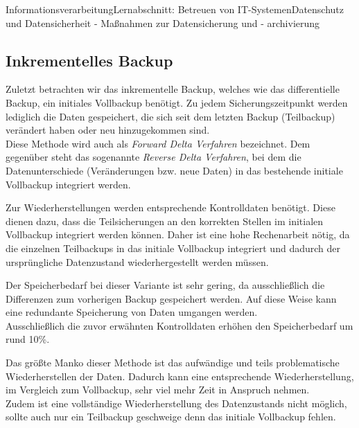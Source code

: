 \documentclass[11pt,oneside,openany,headings=optiontotoc,11pt,numbers=noenddot]{article}
\begin{document}
\begin{worksheet}{Informationsverarbeitung}{Lernabschnitt: Betreuen von IT-Systemen}{Datenschutz und Datensicherheit - Maßnahmen zur Datensicherung und - archivierung}
		\subsection{Inkrementelles Backup}
		Zuletzt betrachten wir das inkrementelle Backup, welches wie das differentielle Backup, ein initiales Vollbackup benötigt. Zu jedem Sicherungszeitpunkt werden lediglich die Daten gespeichert, die sich seit dem letzten Backup (Teilbackup) verändert haben oder neu hinzugekommen sind.\\
		Diese Methode wird auch als \textit{Forward Delta Verfahren} bezeichnet. Dem gegenüber steht das sogenannte \textit{Reverse Delta Verfahren}, bei dem die Datenunterschiede (Veränderungen bzw. neue Daten) in das bestehende initiale Vollbackup integriert werden.\\
		\par\noindent
		Zur Wiederherstellungen werden entsprechende Kontrolldaten benötigt. Diese dienen dazu, dass die Teilsicherungen an den korrekten Stellen im initialen Vollbackup integriert werden können. Daher ist eine hohe Rechenarbeit nötig, da die einzelnen Teilbackups in das initiale Vollbackup integriert und dadurch der ursprüngliche Datenzustand wiederhergestellt werden müssen.\\
		\par\noindent
		Der Speicherbedarf bei dieser Variante ist sehr gering, da ausschließlich die Differenzen zum vorherigen Backup gespeichert werden. Auf diese Weise kann eine redundante Speicherung von Daten umgangen werden.\\
		Ausschließlich die zuvor erwähnten Kontrolldaten erhöhen den Speicherbedarf um rund 10\%.\\
		\par\noindent
		Das größte Manko dieser Methode ist das aufwändige und teils problematische Wiederherstellen der Daten. Dadurch kann eine entsprechende Wiederherstellung, im Vergleich zum Vollbackup, sehr viel mehr Zeit in Anspruch nehmen.\\
		Zudem ist eine vollständige Wiederherstellung des Datenzustands nicht möglich, sollte auch nur ein Teilbackup geschweige denn das initiale Vollbackup fehlen.\\
		\par\noindent

\end{worksheet}
\end{document}
